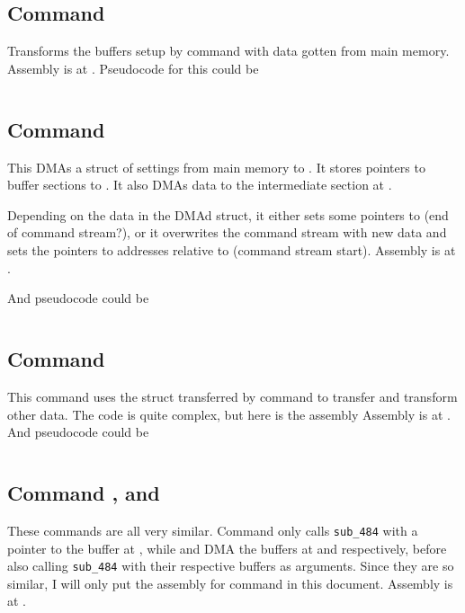 \inputminted{cpp}{../ucode/command_0.c}

\subsection{Command }
Transforms the buffers setup by command  with data gotten from main memory. Assembly is at .
Pseudocode for this could be 

\inputminted{cpp}{../ucode/command_1.c}

\subsection{Command }
This DMAs a struct of settings from main memory to . It stores pointers to buffer sections to . It also DMAs data to the intermediate section at . 

Depending on the data in the DMAd struct, it either sets some pointers to  (end of command stream?), or it overwrites the command stream with new data and sets the pointers to addresses relative to  (command stream start). Assembly is at .

And pseudocode could be

\inputminted{cpp}{../ucode/command_2.c}

\subsection{Command }
This command uses the struct transferred by command  to transfer and transform other data. The code is quite complex, but here is the assembly Assembly is at .
And pseudocode could be

\inputminted{cpp}{../ucode/command_3.c}

\subsection{Command ,  and }
These commands are all very similar. Command  only calls \texttt{sub_484} with a pointer to the buffer at , while  and  DMA the buffers at  and  respectively, before also calling \texttt{sub_484} with their respective buffers as arguments. Since they are so similar, I will only put the assembly for command  in this document. Assembly is at .

